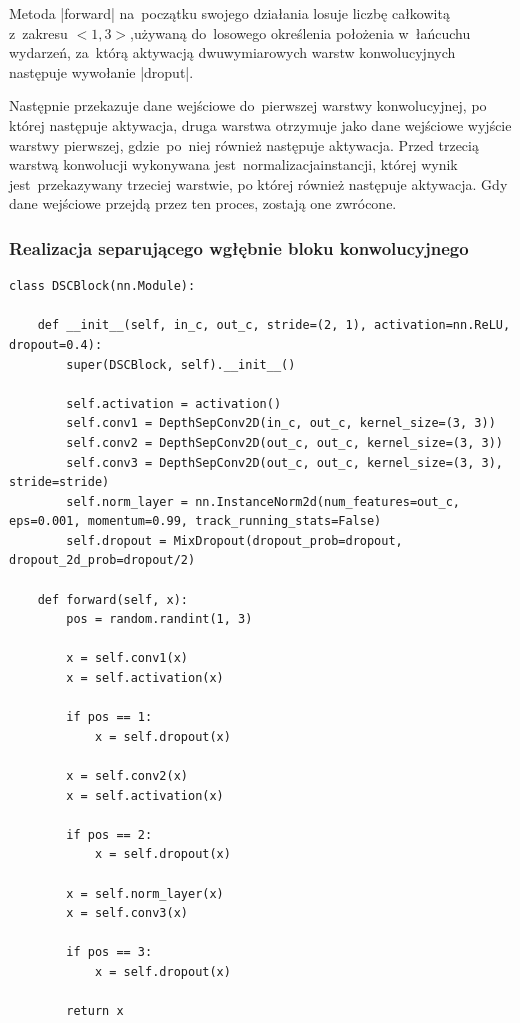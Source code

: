 Metoda \pyth|forward| na~początku swojego działania losuje liczbę całkowitą z~zakresu $<1, 3>$,\linebreak używaną do~losowego określenia położenia w~łańcuchu wydarzeń, za~którą aktywacją dwuwymiarowych warstw konwolucyjnych następuje wywołanie \pyth|droput|.

Następnie przekazuje dane wejściowe do~pierwszej warstwy konwolucyjnej, po której następuje aktywacja, druga warstwa otrzymuje jako dane wejściowe wyjście warstwy pierwszej, gdzie~po~niej również następuje aktywacja. Przed trzecią warstwą konwolucji wykonywana jest~normalizacja\linebreak instancji, której wynik jest~przekazywany trzeciej warstwie, po której również następuje aktywacja. Gdy dane wejściowe przejdą przez ten proces, zostają one zwrócone. 


\subsubsection{Realizacja separującego wgłębnie bloku konwolucyjnego} \label{DSCBlock}
\begin{lstlisting}[caption={\pyth|DSCBlock| - klasa głębokiego separującego bloku konwolucyjnego.}, label={dscblock}]
class DSCBlock(nn.Module):

	def __init__(self, in_c, out_c, stride=(2, 1), activation=nn.ReLU, dropout=0.4):
		super(DSCBlock, self).__init__()
		
		self.activation = activation()
		self.conv1 = DepthSepConv2D(in_c, out_c, kernel_size=(3, 3))
		self.conv2 = DepthSepConv2D(out_c, out_c, kernel_size=(3, 3))
		self.conv3 = DepthSepConv2D(out_c, out_c, kernel_size=(3, 3), stride=stride)
		self.norm_layer = nn.InstanceNorm2d(num_features=out_c, eps=0.001, momentum=0.99, track_running_stats=False)
		self.dropout = MixDropout(dropout_prob=dropout, dropout_2d_prob=dropout/2)
	
	def forward(self, x):
		pos = random.randint(1, 3)
		
		x = self.conv1(x)
		x = self.activation(x)
		
		if pos == 1:
			x = self.dropout(x)
		
		x = self.conv2(x)
		x = self.activation(x)
		
		if pos == 2:
			x = self.dropout(x)
		
		x = self.norm_layer(x)
		x = self.conv3(x)
		
		if pos == 3:
			x = self.dropout(x)
		
		return x
\end{lstlisting}

